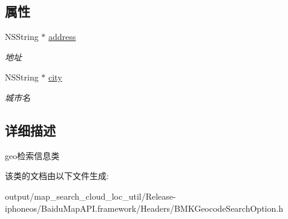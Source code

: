 \subsection*{属性}
\begin{DoxyCompactItemize}
\item 
\hypertarget{interface_b_m_k_geo_code_search_option_a8d27ba1022cbb8b24e0e4f7ab7ec8a46}{}N\+S\+String $\ast$ \hyperlink{interface_b_m_k_geo_code_search_option_a8d27ba1022cbb8b24e0e4f7ab7ec8a46}{address}\label{interface_b_m_k_geo_code_search_option_a8d27ba1022cbb8b24e0e4f7ab7ec8a46}

\begin{DoxyCompactList}\small\item\em 地址 \end{DoxyCompactList}\item 
\hypertarget{interface_b_m_k_geo_code_search_option_ad16f0f623de2a8a74114fb72b2844003}{}N\+S\+String $\ast$ \hyperlink{interface_b_m_k_geo_code_search_option_ad16f0f623de2a8a74114fb72b2844003}{city}\label{interface_b_m_k_geo_code_search_option_ad16f0f623de2a8a74114fb72b2844003}

\begin{DoxyCompactList}\small\item\em 城市名 \end{DoxyCompactList}\end{DoxyCompactItemize}


\subsection{详细描述}
geo检索信息类 

该类的文档由以下文件生成\+:\begin{DoxyCompactItemize}
\item 
output/map\+\_\+search\+\_\+cloud\+\_\+loc\+\_\+util/\+Release-\/iphoneos/\+Baidu\+Map\+A\+P\+I.\+framework/\+Headers/B\+M\+K\+Geocode\+Search\+Option.\+h\end{DoxyCompactItemize}
